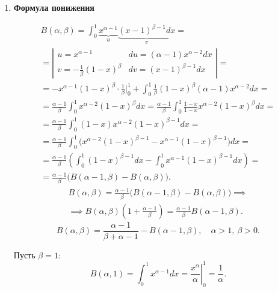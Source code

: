 \begin{enumerate}
          \newpage

    \item \textbf{Формула понижения}

          \begin{note}
              \begin{multline*}
                  B(\alpha,\beta) = \int_{0}^{1}\underbrace{x^{\alpha-1}}_{u}\underbrace{(x-1)^{\beta-1}dx}_{v} = \\
                  = \left|\begin{array}{ll}
                      u = x^{\alpha-1}                & du = (\alpha-1)x^{\alpha-2}dx \\
                      v = -\frac{1}{\beta}(1-x)^\beta & dv = (x-1)^{\beta-1}dx
                  \end{array}\right| = \\
                  = -x^{\alpha-1}(1-x)^\beta \cdot \frac{1}{\beta}\Bigg|_0^1 + \int_{0}^{1}\frac{1}{\beta}(1-x)^\beta(\alpha - 1)x^{\alpha-2}dx = \\
                  = \frac{\alpha -1}{\beta}\int_{0}^{1}x^{\alpha-2}(1-x)^\beta dx = \frac{\alpha - 1}{\beta}\int_{0}^{1}\frac{1-x}{1-x}x^{\alpha-2}(1-x)^\beta dx = \\
                  = \frac{\alpha -1}{\beta}\int_{0}^{1}(1-x)x^{\alpha-2}(1-x)^{\beta-1}dx = \\
                  = \frac{\alpha - 1}{\beta}\int_{0}^{1}\bigl(x^{\alpha-2}(1-x)^{\beta-1} - x^{\alpha-1}(1-x)^{\beta-1}\bigr)dx = \\
                  = \frac{\alpha-1}{\beta}\left(\int_{0}^{1}(1-x)^{\beta-1}dx - \int_{0}^{1}x^{\alpha-1}(1-x)^{\beta-1}dx\right) = \\
                  = \frac{\alpha-1}{\beta}\bigl(B(\alpha-1,\beta) - B(\alpha,\beta)\bigr).
              \end{multline*}
              \begin{multline*}
                  B(\alpha,\beta) = \frac{\alpha-1}{\beta}\bigl(B(\alpha-1,\beta) - B(\alpha,\beta)\bigr) \implies \\
                  \implies B(\alpha,\beta)\left(1 + \frac{\alpha - 1}{\beta}\right) = \frac{\alpha-1}{\beta}B(\alpha-1,\beta).
              \end{multline*}
              \[
                  \boxed{B(\alpha,\beta) = \frac{\alpha -1}{\beta + \alpha -1} - B(\alpha-1,\beta)}, \quad \alpha > 1, \ \beta > 0.
              \]

              Пусть $ \beta = 1 $:
              \[
                  B(\alpha,1) = \int_{0}^{1}x^{\alpha-1}dx = \left.\frac{x^\alpha}{\alpha}\right|_0^1 = \frac{1}{\alpha}.
              \]


\end{note}
\end{enumerate}
